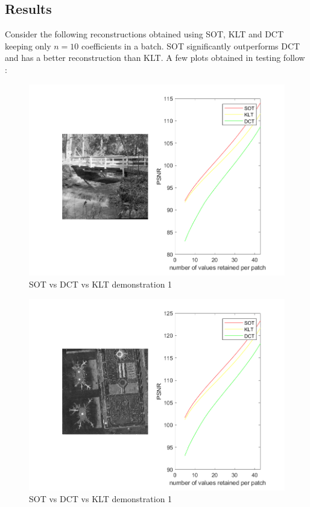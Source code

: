 \documentclass{article}
\theoremstyle{remark}
\begin{document}
\subsection*{Results}
Consider the following reconstructions obtained using SOT, KLT and DCT keeping only $n = 10$ coefficients in a batch. SOT significantly outperforms DCT and has a better reconstruction than KLT.
A few plots obtained in testing follow :
\begin{figure}
\centering
\includegraphics[width=0.9\linewidth]{images/test1.png}
\caption{SOT vs DCT vs KLT demonstration 1}
\end{figure}
\begin{figure}
\centering
\includegraphics[width=0.9\linewidth]{images/test2.png}
\caption{SOT vs DCT vs KLT demonstration 1}
\end{figure}
\end{document}
